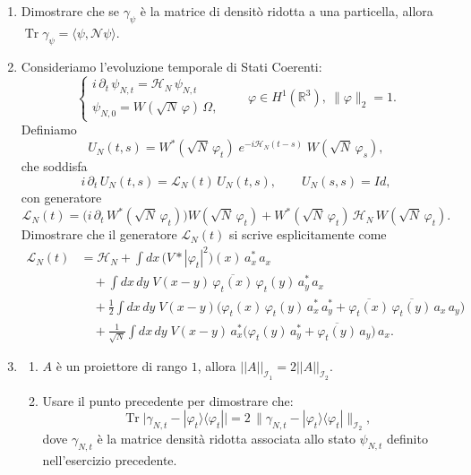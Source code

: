 \documentclass[]{book}
\theoremstyle{definition}
\newcommand{\Om}{\Omega}
\newcommand{\Tr}{\operatorname{Tr}}
\newcommand{\adag}[1]{a^{*}_{#1}}
\newcommand{\an}[1]{a_{#1}}
\newcommand{\LN}{\mathcal{L}_N}
\newcommand{\HN}{\mathcal{H}_N}
\begin{document}
\begin{enumerate}
\item Dimostrare che se \(\gamma_{\psi}\) è la matrice di densitò ridotta a una particella, allora \(\Tr \gamma_{\psi} = \langle \psi, \mathcal{N}\psi\rangle \).
\item Consideriamo l'evoluzione temporale di Stati Coerenti:
\[
\begin{cases}
i\,\partial_t\, \psi_{N,t} = \HN\, \psi_{N,t} \\[2pt]
\psi_{N,0} = W(\sqrt{N}\,\varphi)\,\Om,
\end{cases}
\qquad \varphi \in H^1(\mathbb{R}^3),\ \|\varphi\|_2 = 1.
\]
Definiamo
\[
U_N(t,s) = W^{*}(\sqrt{N}\,\varphi_t)\; e^{-i\HN(t-s)}\; W(\sqrt{N}\,\varphi_s),
\]
che soddisfa
\[
i\,\partial_t\, U_N(t,s) = \LN(t)\, U_N(t,s),
\qquad U_N(s,s) = Id,
\]
con generatore
\[
\LN(t)
= \Big( i\,\partial_t\, W^{*}(\sqrt{N}\,\varphi_t)\Big) W(\sqrt{N}\,\varphi_t)
+ W^{*}(\sqrt{N}\,\varphi_t)\, \HN\, W(\sqrt{N}\,\varphi_t).
\]
Dimostrare che il generatore $\LN(t)$ si scrive esplicitamente come
\begin{align*}
\LN(t) &= \HN
+ \int dx \,\big(V * |\varphi_t|^2\big)(x)\, \adag{x}\, \an{x} \\
&\quad + \int dx\,dy\; V(x-y)\, \overline{\varphi_t(x)}\, \varphi_t(y)\, \adag{y}\, \an{x} \\
&\quad + \frac{1}{2} \int dx\,dy\; V(x-y)
   \Big( \varphi_t(x)\, \varphi_t(y)\, \adag{x}\, \adag{y}
   + \overline{\varphi_t(x)}\, \overline{\varphi_t(y)}\, \an{x}\, \an{y} \Big) \\
&\quad + \frac{1}{\sqrt{N}} \int dx\,dy\; V(x-y)\, \adag{x}
   \big( \varphi_t(y)\, \adag{y} + \overline{\varphi_t(y)}\, \an{y} \big)\, \an{x}.
\end{align*}
\item 
\begin{enumerate}
\item \(A\) è un proiettore di rango \(1\), allora \(||A||_{\mathcal{I}_1} = 2||A||_{\mathcal{I}_2}\).
\item Usare il punto precedente per dimostrare che:
\[
\Tr\big| \gamma_{N,t} - |\varphi_t\rangle \langle\varphi_t| \big| = 2\,\big\| \gamma_{N,t} - |\varphi_t\rangle \langle\varphi_t| \big\|_{\mathcal{I}_2},
\]
dove \(\gamma_{N, t}\) è la matrice densità ridotta associata allo stato \(\psi_{N,t}\) definito nell'esercizio precedente.
\end{enumerate}
\end{enumerate}
\end{document}
